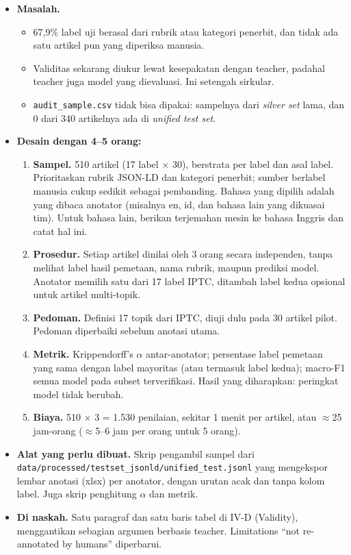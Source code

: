 \documentclass[10pt,a4paper]{article}
\begin{document}
\begin{itemize}
  \item \textbf{Masalah.}
  \begin{itemize}
    \item 67,9\% label uji berasal dari rubrik atau kategori penerbit, dan tidak ada satu artikel pun yang diperiksa manusia.
    \item Validitas sekarang diukur lewat kesepakatan dengan teacher, padahal teacher juga model yang dievaluasi. Ini setengah sirkular.
    \item \texttt{audit\_sample.csv} tidak bisa dipakai: sampelnya dari \emph{silver set} lama, dan 0 dari 340 artikelnya ada di \emph{unified test set}.
  \end{itemize}
  \item \textbf{Desain dengan 4--5 orang:}
  \begin{enumerate}
    \item \textbf{Sampel.} 510 artikel (17 label $\times$ 30), berstrata per label dan asal label. Prioritaskan rubrik JSON-LD dan kategori penerbit; sumber berlabel manusia cukup sedikit sebagai pembanding. Bahasa yang dipilih adalah yang dibaca anotator (misalnya en, id, dan bahasa lain yang dikuasai tim). Untuk bahasa lain, berikan terjemahan mesin ke bahasa Inggris dan catat hal ini.
    \item \textbf{Prosedur.} Setiap artikel dinilai oleh 3 orang secara independen, tanpa melihat label hasil pemetaan, nama rubrik, maupun prediksi model. Anotator memilih satu dari 17 label IPTC, ditambah label kedua opsional untuk artikel multi-topik.
    \item \textbf{Pedoman.} Definisi 17 topik dari IPTC, diuji dulu pada 30 artikel pilot. Pedoman diperbaiki sebelum anotasi utama.
    \item \textbf{Metrik.} Krippendorff's $\alpha$ antar-anotator; persentase label pemetaan yang sama dengan label mayoritas (atau termasuk label kedua); macro-F1 semua model pada subset terverifikasi. Hasil yang diharapkan: peringkat model tidak berubah.
    \item \textbf{Biaya.} 510 $\times$ 3 = 1.530 penilaian, sekitar 1 menit per artikel, atau $\approx$25 jam-orang ($\approx$5--6 jam per orang untuk 5 orang).
  \end{enumerate}
  \item \textbf{Alat yang perlu dibuat.} Skrip pengambil sampel dari \texttt{data/processed/testset\_jsonld/unified\_test.jsonl} yang mengekspor lembar anotasi (xlsx) per anotator, dengan urutan acak dan tanpa kolom label. Juga skrip penghitung $\alpha$ dan metrik.
  \item \textbf{Di naskah.} Satu paragraf dan satu baris tabel di IV-D (Validity), menggantikan sebagian argumen berbasis teacher. Limitations ``not re-annotated by humans'' diperbarui.
\end{itemize}
\end{document}
